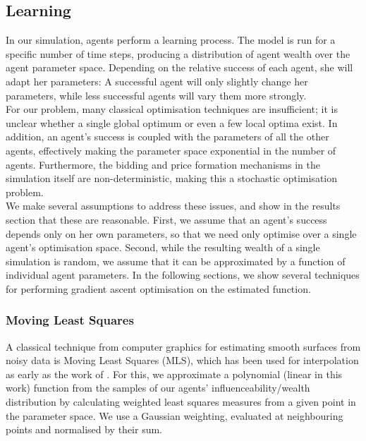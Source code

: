 \documentclass[11pt]{article}
\begin{document}
\subsection{Learning}

In our simulation, agents perform a learning process. The model is run for a specific number of time steps, producing a distribution of agent wealth over the agent parameter space. Depending on the relative success of each agent, she will adapt her parameters: A successful agent will only slightly change her parameters, while less successful agents will vary them more strongly. \\
For our problem, many classical optimisation techniques are insufficient; it is unclear whether a single global optimum or even a few local optima exist. In addition, an agent's success is coupled with the parameters of all the other agents, effectively making the parameter space exponential in the number of agents. Furthermore, the bidding and price formation mechanisms in the simulation itself are non-deterministic, making this a stochastic optimisation problem. \\
We make several assumptions to address these issues, and show in the results section that these are reasonable. First, we assume that an agent's success depends only on her own parameters, so that we need only optimise over a single agent's optimisation space. Second, while the resulting wealth of a single simulation is random, we assume that it can be approximated by a function of individual agent parameters. In the following sections, we show several techniques for performing gradient ascent optimisation on the estimated function. \\

\subsubsection{Moving Least Squares}

A classical technique from computer graphics for estimating smooth surfaces from noisy data is Moving Least Squares (MLS), which has been used for interpolation as early as the work of \citet{lancaster1981surfaces}. For this, we approximate a polynomial (linear in this work) function from the samples of our agents' influenceability/wealth distribution by calculating weighted least squares measures from a given point in the parameter space. We use a Gaussian weighting, evaluated at neighbouring points and normalised by their sum. \\
\end{document}
